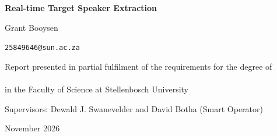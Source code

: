 \begin{titlepage}
\centering
\vspace*{2cm}

{\Huge\bfseries\sffamily Real-time Target Speaker Extraction\par}
\vspace{0.5cm}
{\Large\sffamily 
\par}

\vspace{2.5cm}
{\Large Grant Booysen\par}
\vspace{0.5cm}
{\large \texttt{25849646@sun.ac.za}\par}

\vfill
{\large
Report presented in partial fulfilment of the requirements for the degree of\\
\\
in the Faculty of Science at Stellenbosch University\par}

\vspace{1.5cm}
{\large Supervisors: Dewald J. Swanevelder and David Botha (Smart Operator)\par}

\vspace{1cm}
{\large 
November 2026\par}
\end{titlepage}
